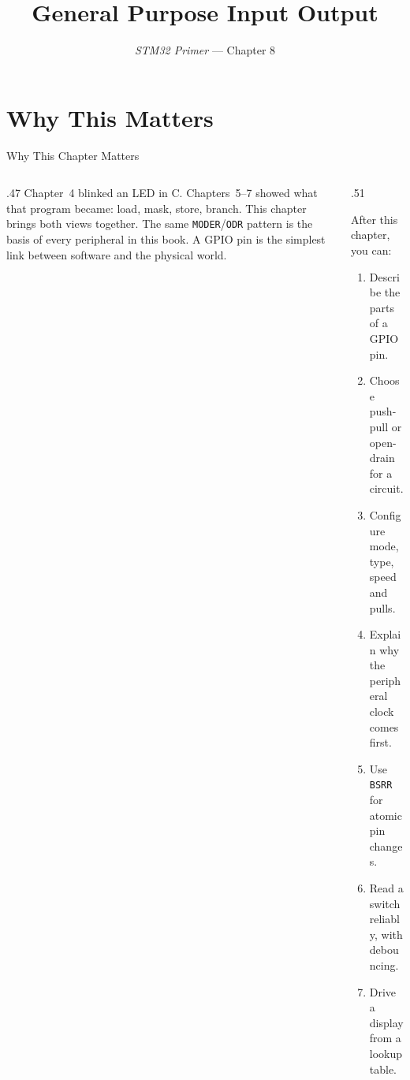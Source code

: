 \documentclass[9pt,aspectratio=169,xcolor=table]{beamer}
\title{General Purpose Input Output}
\subtitle{\emph{STM32 Primer} --- Chapter 8}
\begin{document}
\titlepage

\section{Why This Matters}

\begin{frame}{Why This Chapter Matters}
    \begin{columns}[T]
    \begin{column}{.47\textwidth}
        {\normalsize Chapter~4 blinked an LED in C. Chapters~5--7 showed what that program became: load, mask, store, branch. This chapter brings both views together. The same \texttt{MODER}/\texttt{ODR} pattern is the basis of every peripheral in this book. A GPIO pin is the simplest link between software and the physical world.}
    \end{column}
    \begin{column}{.51\textwidth}
        \begin{block}{After this chapter, you can:}
        {\small
        \begin{enumerate}\itemsep2pt
            \item Describe the parts of a GPIO pin.
            \item Choose push-pull or open-drain for a circuit.
            \item Configure mode, type, speed and pulls.
            \item Explain why the peripheral clock comes first.
            \item Use \texttt{BSRR} for atomic pin changes.
            \item Read a switch reliably, with debouncing.
            \item Drive a display from a lookup table.
        \end{enumerate}}
        \end{block}
    \end{column}
    \end{columns}
\end{frame}
\end{document}
